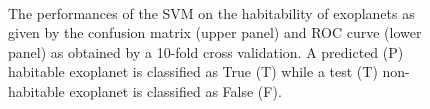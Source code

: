 \documentclass[
12pt, %
a4paper, %
oneside, %
headinclude,footinclude, %
BCOR5mm, %
]{scrartcl}
\begin{document}
\begin{figure}[h]
  \centering
{}\\
\caption{The performances of the SVM on the habitability of exoplanets as given by the confusion matrix (upper panel) and ROC curve (lower panel) as obtained by a 10-fold cross validation.  A predicted (P) habitable exoplanet is classified as True (T) while a test (T) non-habitable exoplanet is classified as False (F).}
\label{SVM_results}
\end{figure}
\end{document}
